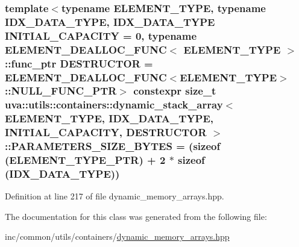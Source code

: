 \subsubsection[{P\+A\+R\+A\+M\+E\+T\+E\+R\+S\+\_\+\+S\+I\+Z\+E\+\_\+\+B\+Y\+T\+E\+S}]{\setlength{\rightskip}{0pt plus 5cm}template$<$typename E\+L\+E\+M\+E\+N\+T\+\_\+\+T\+Y\+P\+E, typename I\+D\+X\+\_\+\+D\+A\+T\+A\+\_\+\+T\+Y\+P\+E, I\+D\+X\+\_\+\+D\+A\+T\+A\+\_\+\+T\+Y\+P\+E I\+N\+I\+T\+I\+A\+L\+\_\+\+C\+A\+P\+A\+C\+I\+T\+Y = 0, typename E\+L\+E\+M\+E\+N\+T\+\_\+\+D\+E\+A\+L\+L\+O\+C\+\_\+\+F\+U\+N\+C$<$ E\+L\+E\+M\+E\+N\+T\+\_\+\+T\+Y\+P\+E $>$\+::func\+\_\+ptr D\+E\+S\+T\+R\+U\+C\+T\+O\+R = E\+L\+E\+M\+E\+N\+T\+\_\+\+D\+E\+A\+L\+L\+O\+C\+\_\+\+F\+U\+N\+C$<$\+E\+L\+E\+M\+E\+N\+T\+\_\+\+T\+Y\+P\+E$>$\+::\+N\+U\+L\+L\+\_\+\+F\+U\+N\+C\+\_\+\+P\+T\+R$>$ constexpr size\+\_\+t {\bf uva\+::utils\+::containers\+::dynamic\+\_\+stack\+\_\+array}$<$ E\+L\+E\+M\+E\+N\+T\+\_\+\+T\+Y\+P\+E, I\+D\+X\+\_\+\+D\+A\+T\+A\+\_\+\+T\+Y\+P\+E, I\+N\+I\+T\+I\+A\+L\+\_\+\+C\+A\+P\+A\+C\+I\+T\+Y, D\+E\+S\+T\+R\+U\+C\+T\+O\+R $>$\+::P\+A\+R\+A\+M\+E\+T\+E\+R\+S\+\_\+\+S\+I\+Z\+E\+\_\+\+B\+Y\+T\+E\+S = (sizeof ({\bf E\+L\+E\+M\+E\+N\+T\+\_\+\+T\+Y\+P\+E\+\_\+\+P\+T\+R}) + 2 $\ast$ sizeof (I\+D\+X\+\_\+\+D\+A\+T\+A\+\_\+\+T\+Y\+P\+E))\hspace{0.3cm}{\ttfamily [static]}}\label{classuva_1_1utils_1_1containers_1_1dynamic__stack__array_a347effea92930daddfb9ba492dedd03a}


Definition at line 217 of file dynamic\+\_\+memory\+\_\+arrays.\+hpp.



The documentation for this class was generated from the following file\+:\begin{DoxyCompactItemize}
\item 
inc/common/utils/containers/\hyperlink{dynamic__memory__arrays_8hpp}{dynamic\+\_\+memory\+\_\+arrays.\+hpp}\end{DoxyCompactItemize}
